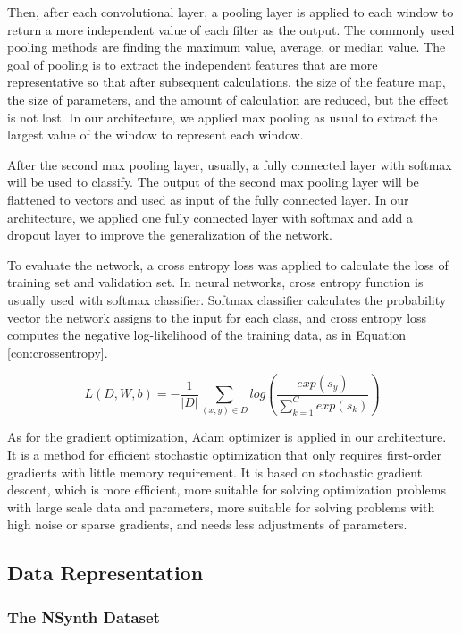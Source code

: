 \documentclass{article}
\begin{document}
Then, after each convolutional layer, a pooling layer is applied to each window to return a more independent value of each filter as the output. The commonly used pooling methods are finding the maximum value, average, or median value. The goal of pooling is to extract the independent features that are more representative so that after subsequent calculations, the size of the feature map, the size of parameters, and the amount of calculation are reduced, but the effect is not lost. In our architecture, we applied max pooling as usual to extract the largest value of the window to represent each window.

After the second max pooling layer, usually, a fully connected layer with softmax will be used to classify. The output of the second max pooling layer will be flattened to vectors and used as input of the fully connected layer. In our architecture, we applied one fully connected layer with softmax and add a dropout layer to improve the generalization of the network.

To evaluate the network, a cross entropy loss was applied to calculate the loss of training set and validation set. In neural networks, cross entropy function is usually used with softmax classifier. Softmax classifier calculates the probability vector the network assigns to the input for each class, and cross entropy loss computes the negative log-likelihood of the training data, as in Equation \ref{con:crossentropy}.

\begin{equation}
L(D, W, b)=-\frac{1}{|D|}\sum_{(x,y)\in D}log(\frac{exp(s_y)}{\sum_{k=1}^{C} exp(s_k)}) \label{con:crossentropy}  
\end{equation}

As for the gradient optimization, Adam optimizer is applied in our architecture. It is a method for efficient stochastic optimization that only requires first-order gradients with little memory requirement.\cite{adam} It is based on stochastic gradient descent, which is more efficient, more suitable for solving optimization problems with large scale data and parameters, more suitable for solving problems with high noise or sparse gradients, and needs less adjustments of parameters.

\subsection{Data Representation}

\subsubsection{The NSynth Dataset}
\end{document}
